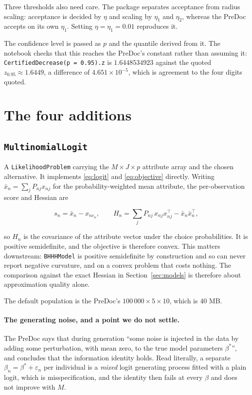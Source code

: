 \documentclass[11pt,a4paper]{article}
\begin{document}
Three thresholds also need care. The package separates acceptance from radius
scaling: acceptance is decided by $\eta$ and scaling by $\eta_1$ and $\eta_2$,
whereas the PreDoc accepts on its own $\eta_1$. Setting $\eta = \eta_1 = 0.01$
reproduces it.

The confidence level is passed as $p$ and the quantile derived from it. The
notebook checks that this reaches the PreDoc's constant rather than assuming it:
\texttt{CertifiedDecrease(p = 0.95).z} is $1.6448534923$ against the quoted
$z_{0.95} \approx 1.6449$, a difference of $4.651\times 10^{-5}$, which is agreement
to the four digits quoted.

\section{The four additions}

\subsection{\texorpdfstring{\texttt{MultinomialLogit}}{MultinomialLogit}}

A \texttt{LikelihoodProblem} carrying the $M \times J \times p$ attribute array and
the chosen alternative. It implements \eqref{eq:logit} and \eqref{eq:objective}
directly. Writing $\bar x_n = \sum_j P_{nj} x_{nj}$ for the probability-weighted
mean attribute, the per-observation score and Hessian are

\begin{equation}
  s_n = \bar x_n - x_{n c_n},
  \qquad
  H_n = \sum_j P_{nj}\, x_{nj} x_{nj}^\top - \bar x_n \bar x_n^\top ,
  \label{eq:mnl-derivs}
\end{equation}

so $H_n$ is the covariance of the attribute vector under the choice probabilities.
It is positive semidefinite, and the objective is therefore convex. This matters
downstream: \texttt{BHHHModel} is positive semidefinite by construction and so can
never report negative curvature, and on a convex problem that costs nothing. The
comparison against the exact Hessian in Section~\ref{sec:models} is therefore about
approximation quality alone.

The default population is the PreDoc's $100\,000 \times 5 \times 10$, which is 40 MB.

\paragraph{The generating noise, and a point we do not settle.} The PreDoc says
that during generation ``some noise is injected in the data by adding some
perturbation, with mean zero, to the true model parameters $\beta^*$'', and
concludes that the information identity holds. Read literally, a separate
$\beta_n = \beta^* + \varepsilon_n$ per individual is a \emph{mixed} logit
generating process fitted with a plain logit, which is misspecification, and the
identity then fails at every $\beta$ and does not improve with $M$.
\end{document}
